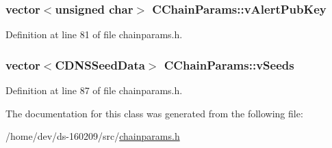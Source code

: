 \hypertarget{class_c_chain_params_a9c48773a65415e2ecac36556f93daf1d}{}
\subsubsection[{v\+Alert\+Pub\+Key}]{\setlength{\rightskip}{0pt plus 5cm}vector$<$unsigned char$>$ C\+Chain\+Params\+::v\+Alert\+Pub\+Key\hspace{0.3cm}{\ttfamily [protected]}}\label{class_c_chain_params_a9c48773a65415e2ecac36556f93daf1d}


Definition at line 81 of file chainparams.\+h.

\hypertarget{class_c_chain_params_ad62171f08f60fe9cce01636df7d0839f}{}
\subsubsection[{v\+Seeds}]{\setlength{\rightskip}{0pt plus 5cm}vector$<${\bf C\+D\+N\+S\+Seed\+Data}$>$ C\+Chain\+Params\+::v\+Seeds\hspace{0.3cm}{\ttfamily [protected]}}\label{class_c_chain_params_ad62171f08f60fe9cce01636df7d0839f}


Definition at line 87 of file chainparams.\+h.



The documentation for this class was generated from the following file\+:\begin{DoxyCompactItemize}
\item 
/home/dev/ds-\/160209/src/\hyperlink{chainparams_8h}{chainparams.\+h}\end{DoxyCompactItemize}

